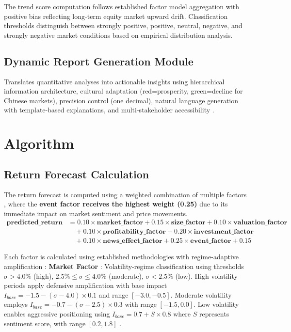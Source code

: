 \documentclass[3p,times,procedia]{elsarticle}
\begin{document}
The trend score computation follows established factor model aggregation with positive bias reflecting long-term equity market upward drift. Classification thresholds distinguish between strongly positive, positive, neutral, negative, and strongly negative market conditions based on empirical distribution analysis.

\subsection{Dynamic Report Generation Module}

Translates quantitative analyses into actionable insights using hierarchical information architecture, cultural adaptation (red=prosperity, green=decline for Chinese markets), precision control (one decimal), natural language generation with template-based explanations, and multi-stakeholder accessibility \cite{Ribeiro2016,Harvey2016}.

\section{Algorithm}

\subsection{Return Forecast Calculation}
The return forecast is computed using a weighted combination of multiple factors \cite{FAMA1993}, where the \textbf{event factor receives the highest weight (0.25)} due to its immediate impact on market sentiment and price movements.
\begin{align}
\mathbf{predicted\_return} &= 0.10 \times \mathbf{market\_factor} + 0.15 \times \mathbf{size\_factor} + 0.10 \times \mathbf{valuation\_factor} \nonumber \\
&\quad + 0.10 \times \mathbf{profitability\_factor} + 0.20 \times \mathbf{investment\_factor} \nonumber \\
&\quad + 0.10 \times \mathbf{news\_effect\_factor} + 0.25 \times \mathbf{event\_factor} + 0.15
\end{align}

Each factor is calculated using established methodologies with regime-adaptive amplification \cite{Carhart1997}: \textbf{Market Factor} \cite{FAMA1993}: Volatility-regime classification using thresholds $\sigma > 4.0\%$ (high), $2.5\% \leq \sigma \leq 4.0\%$ (moderate), $\sigma < 2.5\%$ (low). High volatility periods apply defensive amplification with base impact $I_{base} = -1.5 - (\sigma - 4.0) \times 0.1$ and range $[-3.0, -0.5]$. Moderate volatility employs $I_{base} = -0.7 - (\sigma - 2.5) \times 0.3$ with range $[-1.5, 0.0]$. Low volatility enables aggressive positioning using $I_{base} = 0.7 + S \times 0.8$ where $S$ represents sentiment score, with range $[0.2, 1.8]$ \cite{Nelson1991}.
\end{document}

